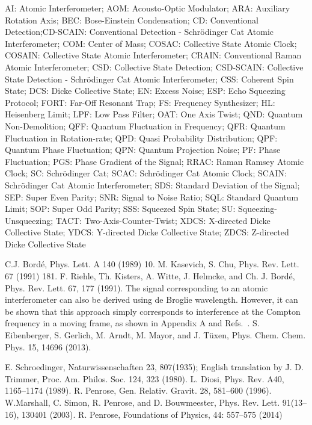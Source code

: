 \documentclass[aps,pra,letterpaper,superscriptaddress,showpacs,amsmath,floats,twocolumn]{revtex4-1}
\begin{document}
{{{{{AI: Atomic Interferometer; AOM: Acousto-Optic Modulator; ARA: Auxiliary Rotation Axis; BEC: Bose-Einstein Condensation; CD: Conventional Detection;CD-SCAIN: Conventional Detection - Schr\"odinger Cat Atomic Interferometer; COM: Center of Mass; COSAC: Collective State Atomic Clock; COSAIN: Collective State Atomic Interferometer; CRAIN: Conventional Raman Atomic Interferometer; CSD: Collective State Detection; CSD-SCAIN: Collective State Detection - Schr\"odinger Cat Atomic Interferometer; CSS: Coherent Spin State; DCS: Dicke Collective State; EN: Excess Noise; ESP: Echo Squeezing Protocol; FORT: Far-Off Resonant Trap; FS: Frequency Synthesizer; HL: Heisenberg Limit; LPF: Low Pass Filter; OAT: One Axis Twist; QND: Quantum Non-Demolition; QFF: Quantum Fluctuation in Frequency; QFR: Quantum Fluctuation in Rotation-rate; QPD: Quasi Probability Distribution; QPF: Quantum Phase Fluctuation; QPN: Quantum Projection Noise; PF: Phase Fluctuation; PGS: Phase Gradient of the Signal; RRAC: Raman Ramsey Atomic Clock; SC: Schr\"odinger Cat; SCAC: Schr\"odinger Cat Atomic Clock; SCAIN: Schr\"odinger Cat Atomic Interferometer; SDS: Standard Deviation of the Signal; SEP: Super Even Parity; SNR: Signal to Noise Ratio; SQL: Standard Quantum Limit; SOP: Super Odd Parity; SSS: Squeezed Spin State; SU: Squeezing-Unsqueezing; TACT: Two-Axis-Counter-Twist; XDCS: X-directed Dicke Collective State; YDCS: Y-directed Dicke Collective State; ZDCS: Z-directed Dicke Collective State



\begin{thebibliography}{100}

 C.J. Bord\'e, Phys. Lett. A 140 (1989) 10.
 M. Kasevich, S. Chu, Phys. Rev. Lett. 67 (1991) 181.
 F. Riehle, Th. Kisters, A. Witte, J. Helmcke, and Ch. J. Bord\'e, Phys. Rev. Lett. 67, 177 (1991).
 The signal corresponding to an atomic interferometer can also be derived using de Broglie wavelength. However, it can be shown that this approach simply corresponds to interference at the Compton frequency in a moving frame, as shown in Appendix A and Refs.~\cite{Lan, COSAIN}.
 S. Eibenberger, S. Gerlich, M. Arndt, M. Mayor, and J. T\"uxen, Phys. Chem. Chem. Phys. 15, 14696 (2013).

 E. Schroedinger, Naturwissenschaften 23, 807(1935); English translation by J. D. Trimmer, Proc. Am. Philos. Soc. 124, 323 (1980).
 L. Diosi, Phys. Rev. A40, 1165–1174 (1989).
 R. Penrose, Gen. Relativ. Gravit. 28, 581–600 (1996).
 W.Marshall, C. Simon, R. Penrose, and D. Bouwmeester, Phys. Rev. Lett. 91(13–16), 130401 (2003).
 R. Penrose, Foundations of Physics, 44: 557–575 (2014)


\end{thebibliography}}}}}}
\end{document}
